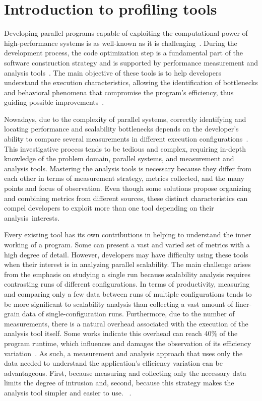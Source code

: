 
\section{Introduction to profiling tools} \label{sec:introduction_to_profiling_tools}

Developing parallel programs capable of exploiting the computational power of high-performance systems is as well-known as it is challenging~\cite{Huck2007, Islam2019, Weber2019}. 
During the development process, the code optimization step is a fundamental part of the software construction strategy and is supported by performance measurement and analysis tools~\cite{Bergel2019, Weber2019, Huck2005, Geimer2010, Shende2006, Adhianto2010, Miller1995, Galobardes2015, Pillet2007, Islam2019}. The main objective of these tools is to help developers understand the execution characteristics, allowing the identification of bottlenecks and behavioral phenomena that compromise the program’s efficiency, thus guiding possible improvements~\cite{Brink2020, Huck2007}.

Nowadays, due to the complexity of parallel systems, correctly identifying and locating performance and scalability bottlenecks depends on the developer's ability to compare several measurements in different execution configurations~\cite{Bergel2019, Silva2018}. This investigative process tends to be tedious and complex, requiring in-depth knowledge of the problem domain, parallel systems, and measurement and analysis tools.
Mastering the analysis tools is necessary because they differ from each other in terms of measurement strategy, metrics collected, and the many points and focus of observation.
Even though some solutions propose organizing and combining metrics from different sources, these distinct characteristics can compel developers to exploit more than one tool depending on their analysis~interests.

Every existing tool has its own contributions in helping to understand the inner working of a program. Some can present a vast and varied set of metrics with a high degree of detail. 
However, developers may have difficulty using these tools when their interest is in analyzing parallel scalability.
The main challenge arises from the emphasis on studying a single run because scalability analysis requires contrasting runs of different configurations.
In terms of productivity, measuring and comparing only a few data between runs of multiple configurations tends to be more significant to scalability analysis than collecting a vast amount of finer-grain data of single-configuration runs.
Furthermore, due to the number of measurements, there is a natural overhead associated with the execution of the analysis tool itself. Some works indicate this overhead can reach 40\% of the program runtime, which influences and damages the observation of its efficiency variation~\cite{Eriksson2016}.
As such, a measurement and analysis approach that uses only the data needed to understand the application's efficiency variation can be advantageous. First, because measuring and collecting only the necessary data limits the degree of intrusion and, second, because this strategy makes the analysis tool simpler and easier to use. 
~\cite{Shende2006}.


